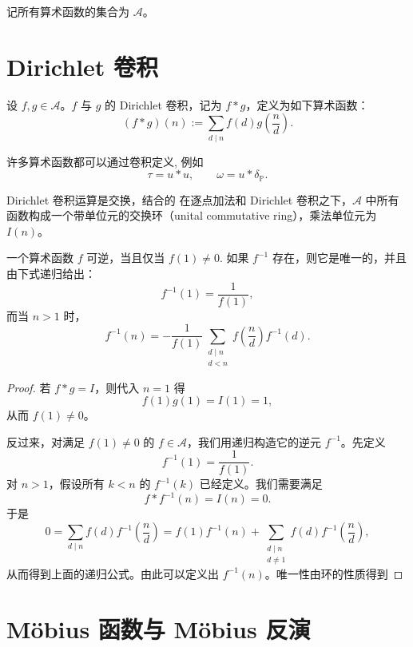 记所有算术函数的集合为 $\mathcal A$。

\section{Dirichlet 卷积}

\begin{definition}
	设 $f,g\in\mathcal A$。$f$ 与 $g$ 的 Dirichlet 卷积，记为 $f*g$，定义为如下算术函数：
	\[
		(f*g)(n):=\sum_{d\mid n} f(d)g\left(\frac nd\right).
	\]
\end{definition}

\begin{remark}
	许多算术函数都可以通过卷积定义, 例如
	\[
		\tau=u*u,
		\qquad
		\omega=u*\delta_{\mathbb P}.
	\]
	

\end{remark}

\begin{theorem}
	Dirichlet 卷积运算是交换，结合的
在逐点加法和 Dirichlet 卷积之下，$\mathcal A$ 中所有函数构成一个带单位元的交换环（unital commutative ring），乘法单位元为 $I(n)$。

\end{theorem}


\begin{theorem}
	一个算术函数 $f$ 可逆，当且仅当
	\(
		f(1)\neq 0.
	\)
	如果 $f^{-1}$ 存在，则它是唯一的，并且由下式递归给出：
	\[
		f^{-1}(1)=\frac{1}{f(1)},
	\]
	而当 $n>1$ 时，
	\[
		f^{-1}(n)
		=
		-\frac{1}{f(1)}
		\sum_{\substack{d\mid n\\ d<n}}
		f\left(\frac nd\right)f^{-1}(d).
	\]
\end{theorem}

\begin{proof}
	若 $f*g=I$，则代入 $n=1$ 得
	\[
		f(1)g(1)=I(1)=1,
	\]
	从而 $f(1)\neq 0$。

	反过来，对满足 $f(1)\neq 0$ 的 $f\in\mathcal A$，我们用递归构造它的逆元 $f^{-1}$。先定义
	\[
		f^{-1}(1)=\frac1{f(1)}.
	\]
	对 $n>1$，假设所有 $k<n$ 的 $f^{-1}(k)$ 已经定义。我们需要满足
	\[
		f*f^{-1}(n)=I(n)=0.
	\]
	于是
	\[
		0
		=
		\sum_{d\mid n} f(d)f^{-1}\left(\frac nd\right)
		=
		f(1)f^{-1}(n)
		+
		\sum_{\substack{d\mid n\\ d\neq 1}}
		f(d)f^{-1}\left(\frac nd\right),
	\]
  从而得到上面的递归公式。由此可以定义出 $f^{-1}(n)$。唯一性由环的性质得到
\end{proof}

\section{Möbius 函数与 Möbius 反演}


